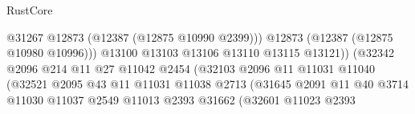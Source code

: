 \begin{lexlean}{RustCore}
\begin{coremodule}
                                                      @31267
                                                      @12873
                                                      (@12387 (@12875 @10990 @2399)))
                                                    @12873
                                                    (@12387 (@12875 @10980 @10996)))
                                                  @13100
                                                  @13103
                                                  @13106
                                                  @13110
                                                  @13115
                                                  @13121))
                                              (@32342
                                                @2096
                                                @214
                                                @11
                                                @27
                                                @11042
                                                @2454
                                                (@32103
                                                  @2096
                                                  @11
                                                  @11031
                                                  @11040
                                                  (@32521
                                                    @2095
                                                    @43
                                                    @11
                                                    @11031
                                                    @11038
                                                    @2713
                                                    (@31645
                                                      @2091
                                                      @11
                                                      @40
                                                      @3714
                                                      @11030
                                                      @11037
                                                      @2549
                                                      @11013
                                                      @2393
                                                      @31662
                                                      (@32601
                                                        @11023
                                                        @2393

\end{coremodule}
\end{lexlean}
